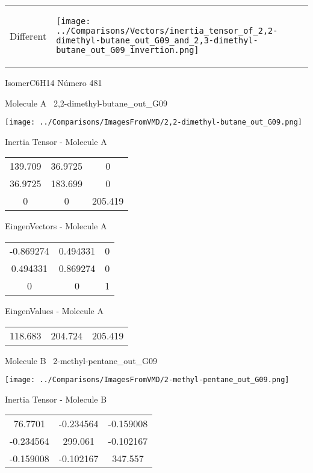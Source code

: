 \vtab[-5mm]
\begin{tabular}{*{2}{m{}}}
\begin{center}
\textcolor{NavyBlue}{\Large Different}
\end{center}
&
\begin{center}
\texttt{[image: ../Comparisons/Vectors/inertia\_tensor\_of\_2,2-dimethyl-butane\_out\_G09\_and\_2,3-dimethyl-butane\_out\_G09\_invertion.png]}
\end{center}
\end{tabular}

 \newpage

\vtab[-3cm]
\begin{center}
{\large IsomerC6H14 \tab Número 481}
\end{center}
\begin{multicols}{2}
\begin{center}

Molecule A \
2,2-dimethyl-butane\_out\_G09

\texttt{[image: ../Comparisons/ImagesFromVMD/2,2-dimethyl-butane\_out\_G09.png]}

Inertia Tensor - Molecule A \\
\begin{tabular}{|c c c|}
139.709	 & 	36.9725	 & 	0	 \\
36.9725	 & 	183.699	 & 	0	 \\
0	 & 	0	 & 	205.419
\end{tabular}

\vtab
 EingenVectors - Molecule A     \\
\begin{tabular}{|c c c|}
-0.869274	 & 	0.494331	 & 	0	 \\
0.494331	 & 	0.869274	 & 	0	 \\
0	 & 	0	 & 	1
\end{tabular}

\vtab
 EingenValues - Molecule A     \\
\begin{tabular}{|c c c|}
118.683	 & 	204.724	 & 	205.419	 \\
\end{tabular}
\columnbreak

Molecule B \
2-methyl-pentane\_out\_G09

\texttt{[image: ../Comparisons/ImagesFromVMD/2-methyl-pentane\_out\_G09.png]}

Inertia Tensor - Molecule B \\
\begin{tabular}{|c c c|}
76.7701	 & 	-0.234564	 & 	-0.159008	 \\
-0.234564	 & 	299.061	 & 	-0.102167	 \\
-0.159008	 & 	-0.102167	 & 	347.557
\end{tabular}


\end{center}
\end{multicols}
